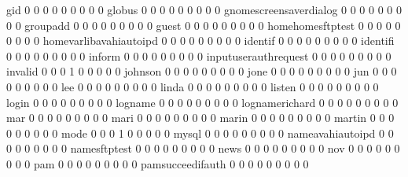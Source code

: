 \documentclass[compress,8pt]{beamer}
\begin{document}
\begin{frame}
\begin{Schunk}
  gid                                        0   0   0   0   0   0   0   0   0
  globus                                     0   0   0   0   0   0   0   0   0
  gnomescreensaverdialog                     0   0   0   0   0   0   0   0   0
  groupadd                                   0   0   0   0   0   0   0   0   0
  guest                                      0   0   0   0   0   0   0   0   0
  homehomesftptest                           0   0   0   0   0   0   0   0   0
  homevarlibavahiautoipd                     0   0   0   0   0   0   0   0   0
  identif                                    0   0   0   0   0   0   0   0   0
  identifi                                   0   0   0   0   0   0   0   0   0
  inform                                     0   0   0   0   0   0   0   0   0
  inputuserauthrequest                       0   0   0   0   0   0   0   0   0
  invalid                                    0   0   0   1   0   0   0   0   0
  johnson                                    0   0   0   0   0   0   0   0   0
  jone                                       0   0   0   0   0   0   0   0   0
  jun                                        0   0   0   0   0   0   0   0   0
  lee                                        0   0   0   0   0   0   0   0   0
  linda                                      0   0   0   0   0   0   0   0   0
  listen                                     0   0   0   0   0   0   0   0   0
  login                                      0   0   0   0   0   0   0   0   0
  logname                                    0   0   0   0   0   0   0   0   0
  lognamerichard                             0   0   0   0   0   0   0   0   0
  mar                                        0   0   0   0   0   0   0   0   0
  mari                                       0   0   0   0   0   0   0   0   0
  marin                                      0   0   0   0   0   0   0   0   0
  martin                                     0   0   0   0   0   0   0   0   0
  mode                                       0   0   0   1   0   0   0   0   0
  mysql                                      0   0   0   0   0   0   0   0   0
  nameavahiautoipd                           0   0   0   0   0   0   0   0   0
  namesftptest                               0   0   0   0   0   0   0   0   0
  news                                       0   0   0   0   0   0   0   0   0
  nov                                        0   0   0   0   0   0   0   0   0
  pam                                        0   0   0   0   0   0   0   0   0
  pamsucceedifauth                           0   0   0   0   0   0   0   0   0

\end{Schunk}
\end{frame}
\end{document}
